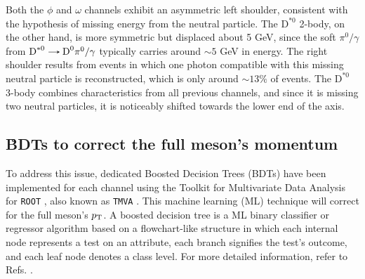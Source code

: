 Both the $\phi$ and $\omega$ channels exhibit an asymmetric left shoulder, consistent with the hypothesis of missing energy from the neutral particle. The $\text{D}^{*0}$ 2-body, on the other hand, is more symmetric but displaced about 5 GeV, since the soft $\pi^{0}/\gamma$ from $\text{D}^{*0}\decaysto \text{D}^{0}\pi^{0}/\gamma$ typically carries around $\sim5$ GeV in energy. The right shoulder results from events in which one photon compatible with this missing neutral particle is reconstructed, which is only around $\sim 13\%$ of events. The $\text{D}^{*0}$ 3-body combines characteristics from all previous channels, and since it is missing two neutral particles, it is noticeably shifted towards the lower end of the axis.

\subsection{\r BDTs to correct the full meson's momentum}

To address this issue, dedicated Boosted Decision Trees (BDTs) have been implemented for each channel using the Toolkit for Multivariate Data Analysis for \verb+ROOT+ \cite{CERN:root}, also known as \verb+TMVA+ \cite{TMVA:2007ngy}. This machine learning (ML) technique will correct for the full meson's $p_\text{T}$. A boosted decision tree is a ML binary classifier or regressor algorithm based on a flowchart-like structure in which each internal node represents a test on an attribute, each branch signifies the test's outcome, and each leaf node denotes a class level. For more detailed information, refer to Refs. \cite{TMVA:2007ngy, Coadou:2022nsh}.

